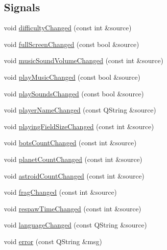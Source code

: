 \subsection*{Signals}
\begin{DoxyCompactItemize}
\item 
void \hyperlink{class_gravitron_settings_a997bf69a2e778b7bbd6beefae8ee8578}{difficulty\+Changed} (const int \&source)
\item 
void \hyperlink{class_gravitron_settings_ac97163add79f61d978415fdc55beef2d}{full\+Screen\+Changed} (const bool \&source)
\item 
void \hyperlink{class_gravitron_settings_a481cf99de16e994c63c3dfeff94123fe}{music\+Sound\+Volume\+Changed} (const int \&source)
\item 
void \hyperlink{class_gravitron_settings_a101f009286632eb4f3c0f10274308200}{play\+Music\+Changed} (const bool \&source)
\item 
void \hyperlink{class_gravitron_settings_a87e9774036049c9593dc5779a94ba6a4}{play\+Sounds\+Changed} (const bool \&source)
\item 
void \hyperlink{class_gravitron_settings_ab12347fa7a95663bf557d703d82d980f}{player\+Name\+Changed} (const Q\+String \&source)
\item 
void \hyperlink{class_gravitron_settings_aaeb6b5aa718d90074b71a8da747d535e}{playing\+Field\+Size\+Changed} (const int \&source)
\item 
void \hyperlink{class_gravitron_settings_a28457660e35d741279ada2a98f6ebd4d}{bots\+Count\+Changed} (const int \&source)
\item 
void \hyperlink{class_gravitron_settings_ac4b5df1b082308bd710280080f1caee6}{planet\+Count\+Changed} (const int \&source)
\item 
void \hyperlink{class_gravitron_settings_a443c7369cc5836f6ea4f98de603ad9e5}{astroid\+Count\+Changed} (const int \&source)
\item 
void \hyperlink{class_gravitron_settings_a79ceaa5ff5b0e30a6b144a92a513c470}{frag\+Changed} (const int \&source)
\item 
void \hyperlink{class_gravitron_settings_aab8e8dddbae563d26becd6279d727788}{respaw\+Time\+Changed} (const int \&source)
\item 
void \hyperlink{class_gravitron_settings_a469a7cb1c07c6f9a9fb905ed535c4244}{language\+Changed} (const Q\+String \&source)
\item 
void \hyperlink{class_gravitron_settings_a2a953f97e01ec9de394bd8b2d23c3bbc}{error} (const Q\+String \&msg)
\end{DoxyCompactItemize}
